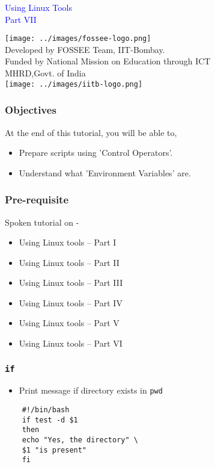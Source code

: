 \documentclass[12pt,compress]{beamer}
\begin{document}
\begin{frame}

\begin{center}
\vspace{12pt}
\textcolor{blue}{\huge Using Linux Tools\\Part VII}
\end{center}
\vspace{18pt}
\begin{center}
\vspace{10pt}
\texttt{[image: ../images/fossee-logo.png]}\\
\vspace{5pt}
\scriptsize Developed by FOSSEE Team, IIT-Bombay. \\ 
\scriptsize Funded by National Mission on Education through ICT\\
\scriptsize  MHRD,Govt. of India\\
\texttt{[image: ../images/iitb-logo.png]}\\
\end{center}
\end{frame}
\begin{frame}
\frametitle{Objectives}
\label{sec-2}

At the end of this tutorial, you will be able to,
\begin{itemize}
\item Prepare scripts using 'Control Operators'.
\item Understand what 'Environment Variables' are.
\end{itemize}
\end{frame}

\begin{frame}
\frametitle{Pre-requisite}
\label{sec-3}

Spoken tutorial on -
\begin{itemize}
\item Using Linux tools -- Part I
\item Using Linux tools -- Part II
\item Using Linux tools -- Part III
\item Using Linux tools -- Part IV
\item Using Linux tools -- Part V
\item Using Linux tools -- Part VI
\end{itemize}
\end{frame}

\begin{frame}[fragile]
  \frametitle{\texttt{if}}
  \begin{itemize}
  \item Print message if directory exists in \texttt{pwd}
  \end{itemize}
  \begin{lstlisting}
    #!/bin/bash
    if test -d $1
    then
    echo "Yes, the directory" \
    $1 "is present"
    fi
  \end{lstlisting} %
\end{frame}
\end{document}
